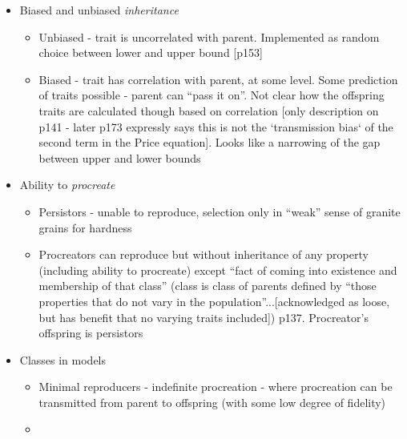 \begin{itemize}
	\item
	
	Biased and unbiased \emph{inheritance}
	
	\begin{itemize}
		\item		
		Unbiased - trait is uncorrelated with parent. Implemented as
		random choice between lower and upper bound {[}p153{]}			
		\item	
		Biased - trait has correlation with parent, at some level. Some
		prediction of traits possible - parent can ``pass it on''. Not
		clear how the offspring traits are calculated though based on
		correlation {[}only description on p141 - later p173 expressly
		says this is not the `transmission bias` of the second term in the
		Price equation{]}. Looks like a narrowing of the gap between upper
		and lower bounds

	\end{itemize}
	\item
	
	Ability to \emph{procreate}	
	
	\begin{itemize}
		\item
		
		Persistors - unable to reproduce, selection only in ``weak'' sense
		of granite grains for hardness
		
		\item
		
		Procreators can reproduce but without inheritance of any property
		(including ability to procreate) except ``fact of coming into
		existence and membership of that class'' (class is class of
		parents defined by ``those properties that do not vary in the
		population''...{[}acknowledged as loose, but has benefit that no
		varying traits included{]}) p137. Procreator's offspring is
		persistors
		
	\end{itemize}
	\item
	
	Classes in models
	
	
	\begin{itemize}
		\item
		
		Minimal reproducers - indefinite procreation - where procreation
		can be transmitted from parent to offspring (with some low degree
		of fidelity)
		
		\item
		

\end{itemize}
\end{itemize}
